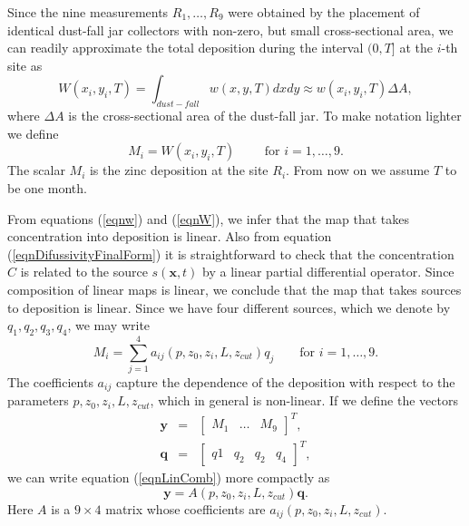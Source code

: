 \documentclass[12pt]{book}
\newcommand{\x}{\textbf{x}}
\newcommand{\y}{\textbf{y}}
\begin{document}
Since the nine measurements $R_{1},\ldots,R_{9}$ were obtained by the placement of identical dust-fall jar collectors with non-zero, but small 
cross-sectional area,
we can readily approximate the total deposition during the interval $(0,T]$ at the $i$-th site as
\begin{equation*}
W(x_{i},y_{i},T)=\int_{dust-fall}w(x,y,T)dxdy\approx w(x_{i},y_{i},T)\Delta A,
\end{equation*}
where $\Delta A$ is the cross-sectional area of the dust-fall jar. To make notation lighter we define
\begin{equation}\label{eqnW}
M_{i}=W(x_{i},y_{i},T)\qquad\text{ for }i=1,\ldots,9.
\end{equation}
The scalar $M_{i}$ is the zinc deposition at the site $R_{i}$. From now on we assume $T$ to 
be one month. 

From equations (\ref{eqnw}) and (\ref{eqnW}),
we infer that the map that takes concentration into deposition is linear. Also from equation
(\ref{eqnDifussivityFinalForm}) it is straightforward to check that the concentration $C$
is related to the source $s(\x,t)$ by a linear partial differential operator. Since composition
of linear maps is linear, we conclude that the map that takes sources to deposition is linear.
Since we have four different sources, which we denote by $q_{1},q_{2},q_{3},q_{4}$, we may write
\begin{equation}\label{eqnLinComb}
M_{i}=\sum_{j=1}^{4}a_{ij}(p,z_{0},z_{i},L,z_{cut})q_{j}\qquad\text{for }i=1,\ldots, 9.
\end{equation}
The coefficients $a_{ij}$ capture the dependence of the deposition with respect to the
parameters $p,z_{0},z_{i},L,z_{cut}$, which in general is non-linear. If 
we define the vectors
\begin{eqnarray*}
\y& = &\begin{bmatrix}
M_{1}&\ldots & M_{9}
\end{bmatrix}^{T}, \\
\textbf{q}&=&\begin{bmatrix}
q{1}&q_{2}&q_{2}&q_{4}
\end{bmatrix}^{T},
\end{eqnarray*}
we can write equation (\ref{eqnLinComb}) more compactly as
\begin{equation}\label{eqnLinRel}
\y=A(p,z_{0},z_{i},L,z_{cut})\textbf{q}.
\end{equation}
Here $A$ is a $9\times 4$ matrix whose coefficients are $a_{ij}(p,z_{0},z_{i},L,z_{cut})$.
\newline
\end{document}
